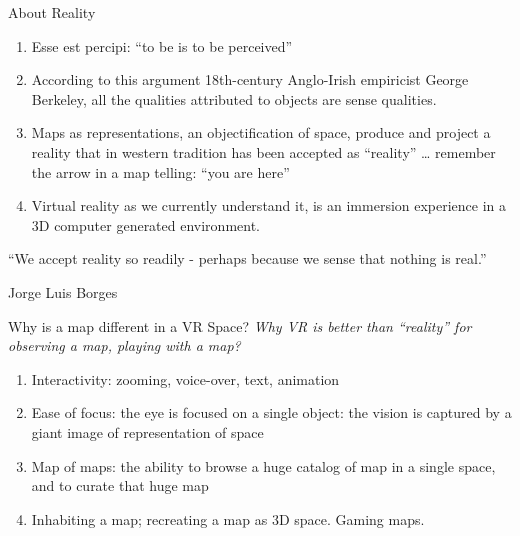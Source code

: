 \documentclass{beamer}
\begin{document}
\begin{frame}{About Reality}
	\begin{enumerate}
		\item Esse est percipi: ``to be is to be perceived''
		\item According to this argument 18th-century Anglo-Irish empiricist George Berkeley, all the qualities attributed to objects are sense qualities.

		\item Maps as representations, an objectification of space, produce and project a reality that in western tradition has been accepted as ``reality'' … remember the arrow in a map telling: ``you are here''

		\item Virtual reality as we currently understand it, is an immersion experience in a 3D computer generated environment. 
	\end{enumerate}

	``We accept reality so readily - perhaps because we sense that nothing is real.''\par
	\hfill Jorge Luis Borges \par
\end{frame}

\begin{frame}{Why is a map different in a VR Space?}
	\textit{Why VR is better than ``reality'' for observing a map, playing with a map?}
	\begin{enumerate}
		\item Interactivity: zooming, voice-over, text, animation
		\item Ease of focus: the eye is focused on a single object: the
			vision is captured by a giant image of representation of space
		\item Map of maps: the ability to browse a huge catalog of map in a single
			space, and to curate that huge map
		\item Inhabiting a map; recreating a map as 3D space. Gaming maps.
	\end{enumerate}
\end{frame}
\end{document}
